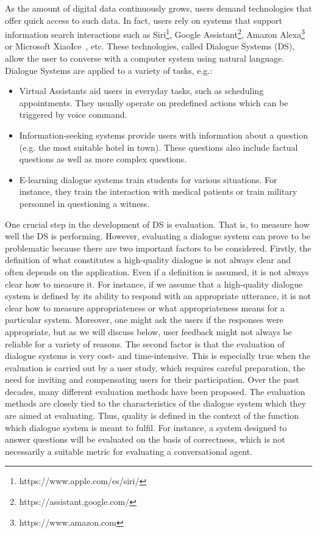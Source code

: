 

As the amount of digital data continuously grows, users demand technologies that offer quick access to such data. In fact, users rely on systems that support information search interactions such as Siri\footnote{https://www.apple.com/es/siri/}, Google Assistant\footnote{https://assistant.google.com/}, Amazon Alexa\footnote{https://www.amazon.com} or Microsoft XiaoIce~, etc. These technologies, called Dialogue Systems (DS), allow the user to converse with a computer system using natural language. Dialogue Systems are applied to a variety of tasks, e.g.:
\begin{itemize}
\item Virtual Assistants aid users in everyday tasks, such as scheduling appointments. They usually operate on predefined actions which can be triggered by voice command. 
\item Information-seeking systems provide users with information about a question (e.g. the most suitable hotel in town). These questions also include factual questions as well as more complex questions. 
\item E-learning dialogue systems train students for various situations. For instance, they train the interaction with medical patients or train military personnel in questioning a witness.
\end{itemize}
One crucial step in the development of DS is evaluation. That is, to measure how well the DS is performing. However, evaluating a dialogue system can prove to be problematic because there are two important factors to be considered. Firstly, the definition of what constitutes a high-quality dialogue is not always clear and often depends on the application. Even if a definition is assumed, it is not always clear how to measure it. For instance, if we assume that a high-quality dialogue system is defined by its ability to respond with an appropriate utterance, it is not clear how to measure appropriateness or what appropriateness means for a particular system. Moreover, one might ask the users if the responses were appropriate, but as we will discuss below, user feedback might not always be reliable for a variety of reasons.
The second factor is that the evaluation of dialogue systems is very cost- and time-intensive. This is especially true when the evaluation is carried out by a user study, which requires careful preparation,  the need for inviting and compensating users for their participation. 
Over the past decades, many different evaluation methods have been proposed. The evaluation methods are closely tied to the characteristics of the dialogue system which they are aimed at evaluating. Thus, quality is defined in the context of the function which dialogue system is meant to fulfil. For instance, a system designed to answer questions will be evaluated on the basis of correctness, which is not necessarily a suitable metric for evaluating a conversational agent.
